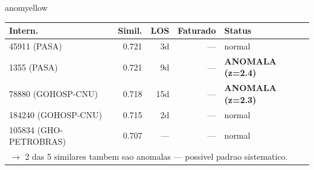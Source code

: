 \documentclass[a4paper,10pt]{article}
\begin{document}
\begin{anomalycard}[Internacao 2420 | GHO-PETROBRAS | MODERADO (z=2.26)]{anomyellow}
\begin{tabular}{l r r r l}\toprule\textbf{Intern.} & \textbf{Simil.} & \textbf{LOS} & \textbf{Faturado} & \textbf{Status} \\\midrule
45911 (PASA) & 0.721 & 3d & --- & \textcolor{jcubeblue}{normal} \\
1355 (PASA) & 0.721 & 9d & --- & \textcolor{anomred}{\textbf{ANOMALA (z=2.4)}} \\
78880 (GOHOSP-CNU) & 0.718 & 15d & --- & \textcolor{anomred}{\textbf{ANOMALA (z=2.3)}} \\
184240 (GOHOSP-CNU) & 0.715 & 2d & --- & \textcolor{jcubeblue}{normal} \\
105834 (GHO-PETROBRAS) & 0.707 & --- & --- & \textcolor{jcubeblue}{normal} \\
\multicolumn{5}{l}{\textcolor{anomred}{\small $\rightarrow$ 2 das 5 similares tambem sao anomalas --- possivel padrao sistematico.}} \\
\bottomrule\end{tabular}


\end{anomalycard}

\newpage
\end{document}
